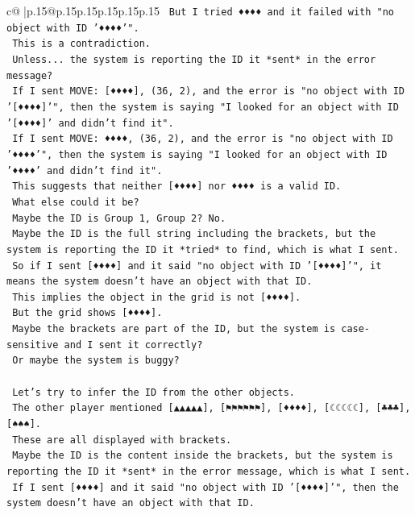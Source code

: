 \documentclass{article}
\begin{document}
{\begin{supertabular}{c@{$\;$}|p{.15\linewidth}@{}p{.15\linewidth}p{.15\linewidth}p{.15\linewidth}p{.15\linewidth}p{.15\linewidth}}
{{{\texttt{    But I tried ♦♦♦♦ and it failed with "no object with ID '♦♦♦♦'".} \\
\texttt{    This is a contradiction.} \\
\texttt{    Unless... the system is reporting the ID it *sent* in the error message?} \\
\texttt{    If I sent MOVE: {[}♦♦♦♦{]}, (36, 2), and the error is "no object with ID '{[}♦♦♦♦{]}'", then the system is saying "I looked for an object with ID '{[}♦♦♦♦{]}' and didn't find it".} \\
\texttt{    If I sent MOVE: ♦♦♦♦, (36, 2), and the error is "no object with ID '♦♦♦♦'", then the system is saying "I looked for an object with ID '♦♦♦♦' and didn't find it".} \\
\texttt{    This suggests that neither {[}♦♦♦♦{]} nor ♦♦♦♦ is a valid ID.} \\
\texttt{    What else could it be?} \\
\texttt{    Maybe the ID is Group 1, Group 2? No.} \\
\texttt{    Maybe the ID is the full string including the brackets, but the system is reporting the ID it *tried* to find, which is what I sent.} \\
\texttt{    So if I sent {[}♦♦♦♦{]} and it said "no object with ID '{[}♦♦♦♦{]}'", it means the system doesn't have an object with that ID.} \\
\texttt{    This implies the object in the grid is not {[}♦♦♦♦{]}.} \\
\texttt{    But the grid shows {[}♦♦♦♦{]}.} \\
\texttt{    Maybe the brackets are part of the ID, but the system is case{-}sensitive and I sent it correctly?} \\
\texttt{    Or maybe the system is buggy?} \\
\\ 
\texttt{    Let's try to infer the ID from the other objects.} \\
\texttt{    The other player mentioned {[}▲▲▲▲▲{]}, {[}⚑⚑⚑⚑⚑⚑{]}, {[}♦♦♦♦{]}, {[}☾☾☾☾☾{]}, {[}♣♣♣{]}, {[}♠♠♠{]}.} \\
\texttt{    These are all displayed with brackets.} \\
\texttt{    Maybe the ID is the content inside the brackets, but the system is reporting the ID it *sent* in the error message, which is what I sent.} \\
\texttt{    If I sent {[}♦♦♦♦{]} and it said "no object with ID '{[}♦♦♦♦{]}'", then the system doesn't have an object with that ID.} \\
}}}
\end{supertabular}}
\end{document}
